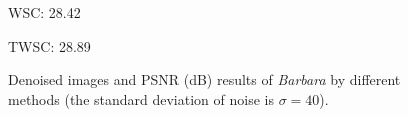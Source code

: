 \begin{figure}[t!]
{\begin{minipage}[t]{0.19\textwidth}
{\footnotesize WSC: 28.42}
\end{minipage}
\begin{minipage}[t]{0.19\textwidth}
\centering
{}
{\footnotesize TWSC: 28.89}
\end{minipage}
}\vspace{-3mm}
\caption{Denoised images and PSNR (dB) results of \textsl{Barbara} by different methods (the standard deviation of noise is $\sigma=40$).}
    \label{fig5-3}
\end{figure}


